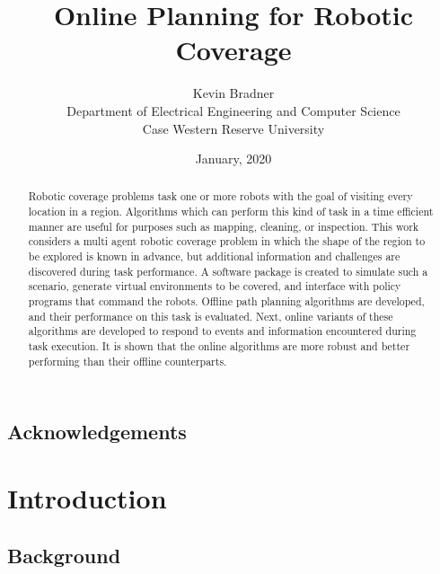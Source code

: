 \documentclass[letterpaper, 12pt, leqno]{report}
\begin{document}

\title{Online Planning for Robotic Coverage}
\author{Kevin Bradner\\Department of Electrical Engineering and Computer Science\\Case Western Reserve University}
\date{January, 2020}
\maketitle

\tableofcontents

\listoftables

\listoffigures

\section*{Acknowledgements}

\begin{abstract}
Robotic coverage problems task one or more robots with the goal of visiting every location in a region. Algorithms which can perform this kind of task in a time efficient manner are useful for purposes such as mapping, cleaning, or inspection. This work considers a multi agent robotic coverage problem in which the shape of the region to be explored is known in advance, but additional information and challenges are discovered during task performance. A software package is created to simulate such a scenario, generate virtual environments to be covered, and interface with policy programs that command the robots. Offline path planning algorithms are developed, and their performance on this task is evaluated. Next, online variants of these algorithms are developed to respond to events and information encountered during task execution. It is shown that the online algorithms are more robust and better performing than their offline counterparts.
\end{abstract}


\chapter{Introduction}

\section{Background}
\end{document}
